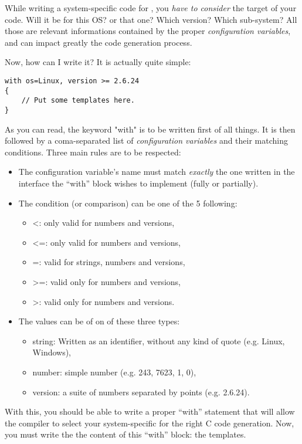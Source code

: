 \documentclass[american]{rtxreport}
\begin{document}
While writing a system-specific code for \rtx, you \emph{have to consider}
the target of your code. Will it be for this OS? or that one? Which version?
Which sub-system? All those are relevant informations contained by the proper
\emph{configuration variables}, and can impact greatly the code generation
process.

Now, how can I write it? It is actually quite simple:
\begin{lstlisting}
with os=Linux, version >= 2.6.24
{
    // Put some templates here.
}
\end{lstlisting}

As you can read, the keyword "with" is to be written first of all things. It is
then followed by a coma-separated list of \emph{configuration variables} and
their matching conditions. Three main rules are to be respected:
\begin{itemize}
    \item The configuration variable's name must match \emph{exactly} the one
          written in the interface the “with” block wishes to implement
          (fully or partially).
    \item The condition (or comparison) can be one of the 5 following: 
        \begin{itemize}
            \item <: only valid for numbers and versions,
            \item <=: only valid for numbers and versions,
            \item =: valid for strings, numbers and versions,
            \item >=: valid only for numbers and versions,
            \item >: valid only for numbers and versions.
        \end{itemize}
    \item The values can be of on of these three types:
        \begin{itemize}
            \item string: Written as an identifier, without any kind of quote
                           (e.g. Linux, Windows),
            \item number: simple number (e.g. 243, 7623, 1, 0),
            \item version: a suite of numbers separated by points (e.g. 2.6.24).
        \end{itemize}
\end{itemize}

With this, you should be able to write a proper “with” statement that will
allow the compiler to select your system-specific for the right C code
generation. Now, you must write the the content of this “with” block:
the templates.
\end{document}
